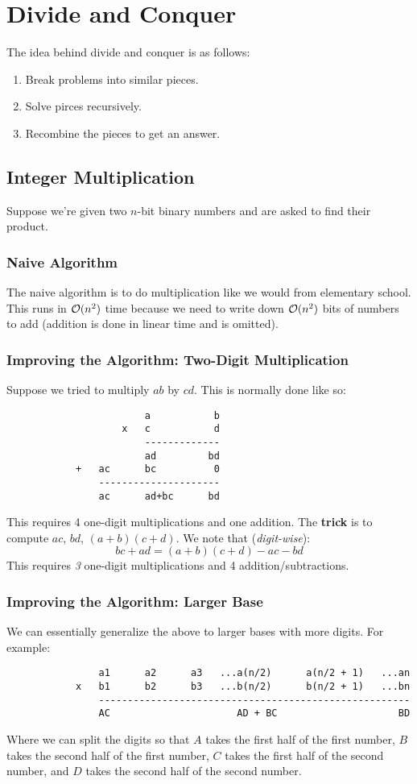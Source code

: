 \documentclass[letterpaper]{article}
\begin{document}
\section{Divide and Conquer}
The idea behind divide and conquer is as follows: 
\begin{enumerate}
    \item Break problems into similar pieces. 
    \item Solve pirces recursively. 
    \item Recombine the pieces to get an answer.
\end{enumerate}

\subsection{Integer Multiplication}
Suppose we're given two $n$-bit binary numbers and are asked to find their product. 

\subsubsection{Naive Algorithm}
The naive algorithm is to do multiplication like we would from elementary school. This runs in $\mathcal{O}(n^2)$ time because we need to write down $\mathcal{O}(n^2)$ bits of numbers to add (addition is done in linear time and is omitted).

\subsubsection{Improving the Algorithm: Two-Digit Multiplication}
Suppose we tried to multiply $ab$ by $cd$. This is normally done like so: 
\begin{verbatim}
                        a           b
                    x   c           d
                        -------------
                        ad         bd 
            +   ac      bc          0
                ---------------------
                ac      ad+bc      bd 
\end{verbatim}
This requires 4 one-digit multiplications and one addition. The \textbf{trick} is to compute $ac$, $bd$, $(a + b)(c + d)$. We note that (\emph{digit-wise}): 
\[bc + ad = (a + b)(c + d) - ac - bd\]
This requires \emph{3} one-digit multiplications and 4 addition/subtractions.

\subsubsection{Improving the Algorithm: Larger Base}
We can essentially generalize the above to larger bases with more digits. For example:
\begin{verbatim}
                a1      a2      a3   ...a(n/2)      a(n/2 + 1)   ...an
            x   b1      b2      b3   ...b(n/2)      b(n/2 + 1)   ...bn
                ------------------------------------------------------
                AC                      AD + BC                     BD 
\end{verbatim}
Where we can split the digits so that $A$ takes the first half of the first number, $B$ takes the second half of the first number, $C$ takes the first half of the second number, and $D$ takes the second half of the second number. 
\end{document}
